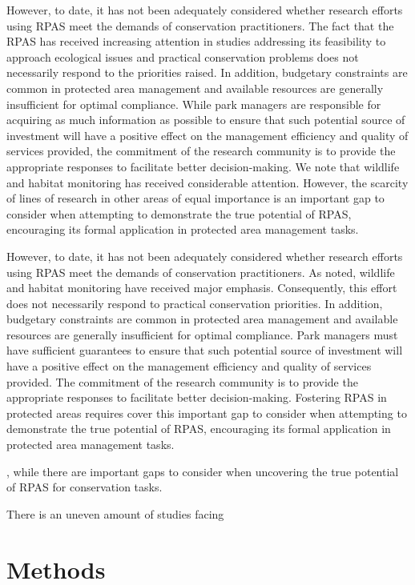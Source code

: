 \documentclass[]{interact}
\theoremstyle{plain}%
\theoremstyle{definition}
\theoremstyle{remark}
\begin{document}
However, to date, it has not been adequately considered whether research
efforts using RPAS meet the demands of conservation practitioners. The
fact that the RPAS has received increasing attention in studies
addressing its feasibility to approach ecological issues and practical
conservation problems does not necessarily respond to the priorities
raised. In addition, budgetary constraints are common in protected area
management and available resources are generally insufficient for
optimal compliance. While park managers are responsible for acquiring as
much information as possible to ensure that such potential source of
investment will have a positive effect on the management efficiency and
quality of services provided, the commitment of the research community
is to provide the appropriate responses to facilitate better
decision-making. We note that wildlife and habitat monitoring has
received considerable attention. However, the scarcity of lines of
research in other areas of equal importance is an important gap to
consider when attempting to demonstrate the true potential of RPAS,
encouraging its formal application in protected area management tasks.

However, to date, it has not been adequately considered whether research
efforts using RPAS meet the demands of conservation practitioners. As
noted, wildlife and habitat monitoring have received major emphasis.
Consequently, this effort does not necessarily respond to practical
conservation priorities. In addition, budgetary constraints are common
in protected area management and available resources are generally
insufficient for optimal compliance. Park managers must have sufficient
guarantees to ensure that such potential source of investment will have
a positive effect on the management efficiency and quality of services
provided. The commitment of the research community is to provide the
appropriate responses to facilitate better decision-making. Fostering
RPAS in protected areas requires cover this important gap to consider
when attempting to demonstrate the true potential of RPAS, encouraging
its formal application in protected area management tasks.

, while there are important gaps to consider when uncovering the true
potential of RPAS for conservation tasks.

There is an uneven amount of studies facing

\section{Methods}\label{methods}
\end{document}
